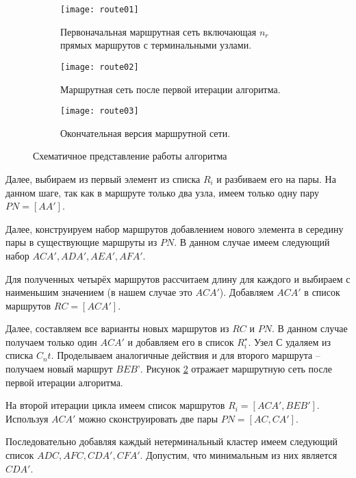 \begin{figure}[ht!]
    \centering
    \begin{subfigure}{0.3\textwidth}
        \centering
        \texttt{[image: route01]}
        \caption{Первоначальная маршрутная сеть включающая \( n_r \) прямых маршрутов с терминальными узлами.}
        \label{fig:route_first}
    \end{subfigure}
    \begin{subfigure}{0.3\textwidth}
        \centering
        \texttt{[image: route02]}
        \caption{Маршрутная сеть после первой итерации алгоритма.}
        \label{fig:route_second}
    \end{subfigure}
    \begin{subfigure}{0.3\textwidth}
        \centering
        \texttt{[image: route03]}
        \caption{Окончательная версия маршрутной сети.}
        \label{fig:route_third}
    \end{subfigure}
    \caption{Схематичное представление работы алгоритма}
    \label{fig:route}
\end{figure}

Далее, выбираем из первый элемент из списка \( R_i \) и разбиваем его на пары. На данном шаге, так как 
в маршруте только два узла, имеем только одну пару \( PN = [AA'] \).

Далее, конструируем набор маршрутов добавлением нового элемента в середину пары в существующие маршруты 
из \( PN \). В данном случае имеем следующий набор \( ACA', ADA', AEA', AFA' \).

Для полученных четырёх маршрутов рассчитаем длину для каждого и выбираем с наименьшим значением 
(в нашем случае это \( ACA' \)). Добавляем \( ACA' \) в список маршрутов \( RC = [ACA'] \).

Далее, составляем все варианты новых маршрутов из \( RC \) и \( PN \). В данном случае получаем только 
один \( ACA' \) и добавляем его в список \( R^{\star}_{i} \). Узел \( С \) удаляем из списка \( C_nt \).
Проделываем аналогичные действия и для второго маршрута -- получаем новый маршрут \( BEB’ \).
Рисунок \ref{fig:route_second} отражает маршрутную сеть после первой итерации алгоритма.

На второй итерации цикла имеем список маршрутов \( R_i = [ACA', BEB'] \). Используя \( ACA' \) можно 
сконструировать две пары \( PN=[AC, CA'] \).

Последовательно добавляя каждый нетерминальный кластер имеем следующий список \( ADC, AFC, CDA', CFA' \). 
Допустим, что минимальным из них является \( CDA' \).

